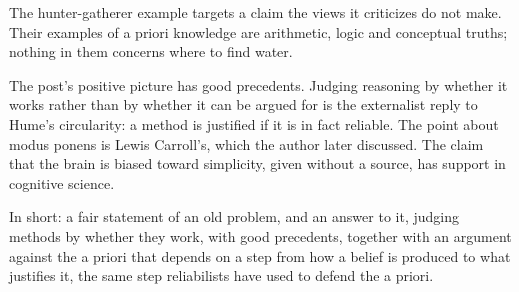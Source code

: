 \begin{afterword}
The hunter-gatherer example targets a claim the views it criticizes do not make. Their examples of a priori knowledge are arithmetic, logic and conceptual truths; nothing in them concerns where to find water.

The post's positive picture has good precedents. Judging reasoning by whether it works rather than by whether it can be argued for is the externalist reply to Hume's circularity: a method is justified if it is in fact reliable. The point about modus ponens is Lewis Carroll's, which the author later discussed. The claim that the brain is biased toward simplicity, given without a source, has support in cognitive science.

In short: a fair statement of an old problem, and an answer to it, judging methods by whether they work, with good precedents, together with an argument against the a priori that depends on a step from how a belief is produced to what justifies it, the same step reliabilists have used to defend the a priori.
\end{afterword}
